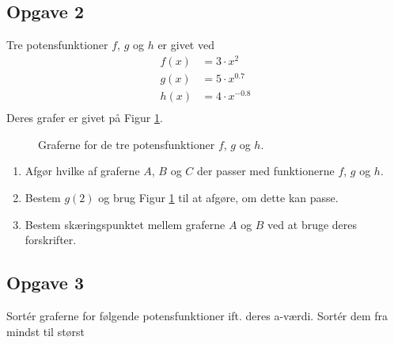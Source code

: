 \subsection*{Opgave 2}
Tre potensfunktioner $f$, $g$ og $h$ er givet ved
\begin{align*}
	f(x) &= 3\cdot x ^2\\
	g(x) &= 5\cdot x^{0.7}\\
	h(x) &= 4\cdot x^{-0.8}\\
\end{align*}
Deres grafer er givet på Figur \ref{fig:potensgrafer}.
\begin{figure}[H]
	\centering
	\caption{Graferne for de tre potensfunktioner $f$, $g$ og $h$.}
	\label{fig:potensgrafer}
\end{figure}

\begin{enumerate}[label=\roman*)]
	\item Afgør hvilke af graferne $A$, $B$ og $C$ der passer med funktionerne $f$, $g$ og $h$.
	\item Bestem $g(2)$ og brug Figur \ref{fig:potensgrafer} til at afgøre, om dette kan passe.
	\item Bestem skæringspunktet mellem graferne $A$ og $B$ ved at bruge deres forskrifter.
\end{enumerate}

\subsection*{Opgave 3}

Sortér graferne for følgende potensfunktioner ift. deres a-værdi. Sortér dem fra mindst til størst

